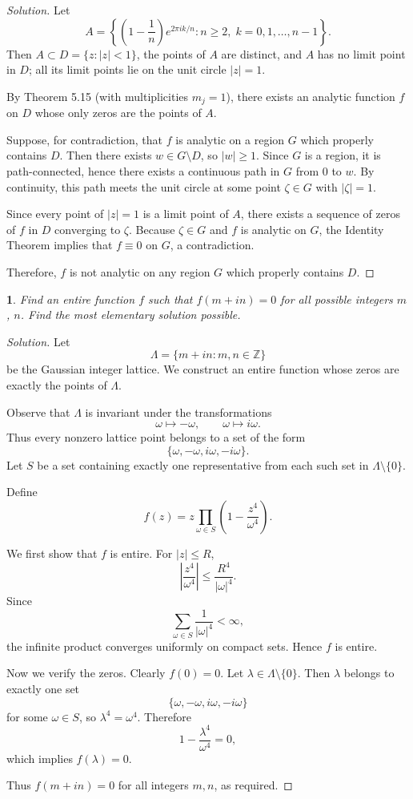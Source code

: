 \documentclass[12pt, a4paper]{report}
\theoremstyle{spaced}
\newtheorem{exercise}{}
\newcommand{\setexercise}[1]{\setcounter{exercise}{#1-1}}
\begin{document}
\begin{proof}[Solution]
	Let
	\[
		A=\left\{\left(1-\frac{1}{n}\right)e^{2\pi i k/n} : n\ge 2,\; k=0,1,\dots,n-1\right\}.
	\]
	Then $A \subset D=\{z:|z|<1\}$, the points of $A$ are distinct, and $A$ has no limit point in $D$; all its limit points lie on the unit circle $|z|=1$.

	By Theorem 5.15 (with multiplicities $m_j=1$), there exists an analytic function $f$ on $D$ whose only zeros are the points of $A$.

	Suppose, for contradiction, that $f$ is analytic on a region $G$ which properly contains $D$. Then there exists $w\in G\setminus D$, so $|w|\ge 1$. Since $G$ is a region, it is path-connected, hence there exists a continuous path in $G$ from $0$ to $w$. By continuity, this path meets the unit circle at some point $\zeta\in G$ with $|\zeta|=1$.

	Since every point of $|z|=1$ is a limit point of $A$, there exists a sequence of zeros of $f$ in $D$ converging to $\zeta$. Because $\zeta\in G$ and $f$ is analytic on $G$, the Identity Theorem implies that $f\equiv 0$ on $G$, a contradiction.

	Therefore, $f$ is not analytic on any region $G$ which properly contains $D$.
\end{proof}

\setexercise{13}
\begin{exercise}
	Find an entire function $f$ such that $f(m+in)=0$ for all possible integers $m$, $n$. Find the most elementary solution possible.
\end{exercise}
\begin{proof}[Solution]
	Let
	\[
		\Lambda = \{m+in : m,n \in \mathbb{Z}\}
	\]
	be the Gaussian integer lattice. We construct an entire function whose zeros are exactly the points of \(\Lambda\).

	Observe that \(\Lambda\) is invariant under the transformations
	\[
		\omega \mapsto -\omega, \qquad \omega \mapsto i\omega.
	\]
	Thus every nonzero lattice point belongs to a set of the form
	\[
		\{\omega, -\omega, i\omega, -i\omega\}.
	\]
	Let \(S\) be a set containing exactly one representative from each such set in \(\Lambda \setminus \{0\}\).

	Define
	\[
		f(z) = z \prod_{\omega \in S} \left(1 - \frac{z^4}{\omega^4}\right).
	\]

	We first show that \(f\) is entire. For \(|z| \le R\),
	\[
		\left| \frac{z^4}{\omega^4} \right| \le \frac{R^4}{|\omega|^4}.
	\]
	Since
	\[
		\sum_{\omega \in S} \frac{1}{|\omega|^4} < \infty,
	\]
	the infinite product converges uniformly on compact sets. Hence \(f\) is entire.

	Now we verify the zeros. Clearly \(f(0) = 0\). Let \(\lambda \in \Lambda \setminus \{0\}\). Then \(\lambda\) belongs to exactly one set
	\[
		\{\omega, -\omega, i\omega, -i\omega\}
	\]
	for some \(\omega \in S\), so \(\lambda^4 = \omega^4\). Therefore
	\[
		1 - \frac{\lambda^4}{\omega^4} = 0,
	\]
	which implies \(f(\lambda) = 0\).

	Thus \(f(m+in) = 0\) for all integers \(m,n\), as required.
\end{proof}
\end{document}
